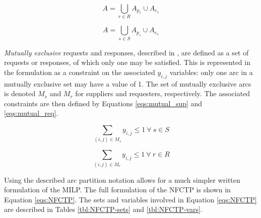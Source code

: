 \begin{equation}\label{eqs:arc-union}
  A = \bigcup_{r \in R} A_{p_r} \cup A_{e_r}
\end{equation}

\begin{equation}\label{eqs:arc-union}
  A = \bigcup_{s \in S} A_{p_s} \cup A_{e_s}
\end{equation}


\textit{Mutually exclusive} requests and responses, described in
, are defined as a set of requests or responses, of which
only one may be satisfied. This is represented in the formulation as a
constraint on the associated $y_{i,j}$ variables: only one arc in a mutually
exclusive set may have a value of 1. The set of mutually exclusive arcs is
denoted $M_s$ and $M_r$ for suppliers and requesters, respectively. The
associated constraints are then defined by Equations \ref{eqs:mutual_sup} and
\ref{eqs:mutual_req}.

\begin{equation}\label{eqs:mutual_sup}
  \sum_{(i, j) \in M_{s}} y_{i,j} \leq 1 \: \forall \: s \in S 
\end{equation}

\begin{equation}\label{eqs:mutual_req}
  \sum_{(i, j) \in M_{r}} y_{i,j} \leq 1 \: \forall \: r \in R 
\end{equation}


Using the described arc partition notation allows for a much simpler written
formulation of the MILP. The full formulation of the NFCTP is shown in Equation
\ref{eqs:NFCTP}.  The sets and variables involved in Equation \ref{eqs:NFCTP}
are described in Tables \ref{tbl:NFCTP-sets} and \ref{tbl:NFCTP-vars}.


